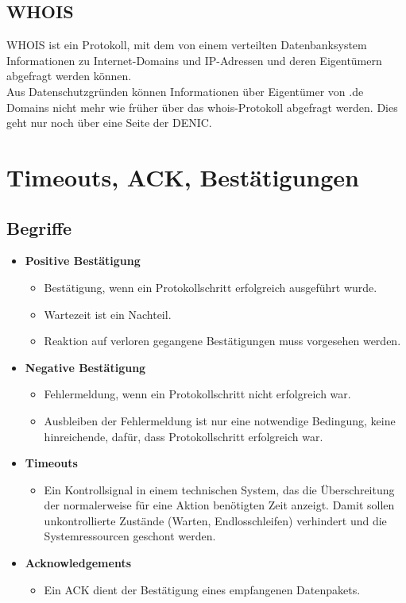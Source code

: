 \documentclass{article} %
\begin{document}
\subsection{WHOIS}
WHOIS ist ein Protokoll, mit dem von einem verteilten Datenbanksystem Informationen zu Internet-Domains und IP-Adressen und deren Eigentümern abgefragt werden können.\\
Aus Datenschutzgründen können Informationen über Eigentümer von .de Domains nicht mehr wie früher über das whois-Protokoll abgefragt werden. Dies geht nur noch über eine Seite der DENIC.


\section{Timeouts, ACK, Bestätigungen}
	\subsection{Begriffe}
	\begin{itemize}
		\item \textbf{Positive Bestätigung}
		\begin{itemize}
			\item Bestätigung, wenn ein Protokollschritt erfolgreich ausgeführt wurde.
			\item Wartezeit ist ein Nachteil.
			\item Reaktion auf verloren gegangene Bestätigungen muss
			vorgesehen werden.
		\end{itemize}
		\item \textbf{Negative Bestätigung}
		\begin{itemize}
			\item Fehlermeldung, wenn ein Protokollschritt nicht erfolgreich war.
			\item Ausbleiben der Fehlermeldung ist nur eine notwendige
			Bedingung, keine hinreichende, dafür, dass Protokollschritt
			erfolgreich war.
		\end{itemize}		
		\item \textbf{Timeouts}
		\begin{itemize}
			\item Ein Kontrollsignal in einem technischen System, das die Überschreitung der normalerweise für eine Aktion benötigten Zeit anzeigt. Damit sollen unkontrollierte Zustände (Warten, Endlosschleifen) verhindert und die Systemressourcen geschont werden.\cite{timeout}
		\end{itemize}		
		\item \textbf{Acknowledgements}
		\begin{itemize}
			\item Ein ACK dient der Bestätigung eines empfangenen Datenpakets.
		\end{itemize}
	\end{itemize}
	
\end{document}
